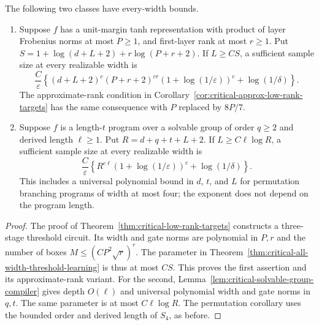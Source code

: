 \begin{corollary}
\label{cor:critical-all-width-structured-targets}
The following two classes have every-width bounds.
\begin{enumerate}
\item Suppose $f$ has a unit-margin tanh representation with product of
layer Frobenius norms at most $P\ge1$, and first-layer rank at most $r\ge1$.
Put $S=1+\log(d+L+2)+r\log(P+r+2)$. If $L\ge CS$, a sufficient sample
size at every realizable width is
\[
 \frac C\varepsilon\left\{
 (d+L+2)^c(P+r+2)^{cr}(1+\log(1/\varepsilon))^c
 +\log(1/\delta)\right\}.
\]
The approximate-rank condition in
Corollary~\ref{cor:critical-approx-low-rank-targets} has the same
consequence with $P$ replaced by $8P/7$.
\item Suppose $f$ is a length-$t$ program over a solvable group of
order $q\ge2$ and derived length $\ell\ge1$. Put $R=d+q+t+L+2$.
If $L\ge C\ell\log R$, a sufficient sample size at every realizable
width is
\[
 \frac C\varepsilon\left\{
 R^{c\ell}(1+\log(1/\varepsilon))^c+\log(1/\delta)\right\}.
\]
This includes a universal polynomial bound in $d$, $t$, and $L$ for
permutation branching programs of width at most four; the exponent does
not depend on the program length.
\end{enumerate}
\end{corollary}

\begin{proof}
The proof of Theorem~\ref{thm:critical-low-rank-targets} constructs a
three-stage threshold circuit. Its width and gate norms are polynomial
in $P,r$ and the number of boxes $M\le(CP^2\sqrt r)^r$. The parameter
in Theorem~\ref{thm:critical-all-width-threshold-learning} is thus at
most $CS$. This proves the first assertion and its approximate-rank
variant. For the second,
Lemma~\ref{lem:critical-solvable-group-compiler} gives depth $O(\ell)$
and universal polynomial width and gate norms in $q,t$. The same
parameter is at most $C\ell\log R$. The permutation corollary uses
the bounded order and derived length of $S_4$, as before.
\end{proof}


